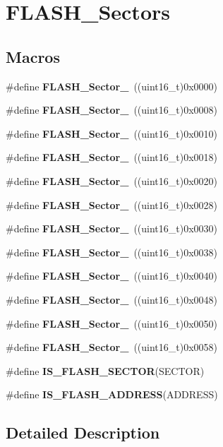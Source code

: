 \section{F\+L\+A\+S\+H\+\_\+\+Sectors}
\label{group__FLASH__Sectors}
\subsection*{Macros}
\begin{DoxyCompactItemize}
\item 
\#define \textbf{ F\+L\+A\+S\+H\+\_\+\+Sector\+\_}~((uint16\+\_\+t)0x0000)
\item 
\#define \textbf{ F\+L\+A\+S\+H\+\_\+\+Sector\+\_}~((uint16\+\_\+t)0x0008)
\item 
\#define \textbf{ F\+L\+A\+S\+H\+\_\+\+Sector\+\_}~((uint16\+\_\+t)0x0010)
\item 
\#define \textbf{ F\+L\+A\+S\+H\+\_\+\+Sector\+\_}~((uint16\+\_\+t)0x0018)
\item 
\#define \textbf{ F\+L\+A\+S\+H\+\_\+\+Sector\+\_}~((uint16\+\_\+t)0x0020)
\item 
\#define \textbf{ F\+L\+A\+S\+H\+\_\+\+Sector\+\_}~((uint16\+\_\+t)0x0028)
\item 
\#define \textbf{ F\+L\+A\+S\+H\+\_\+\+Sector\+\_}~((uint16\+\_\+t)0x0030)
\item 
\#define \textbf{ F\+L\+A\+S\+H\+\_\+\+Sector\+\_}~((uint16\+\_\+t)0x0038)
\item 
\#define \textbf{ F\+L\+A\+S\+H\+\_\+\+Sector\+\_}~((uint16\+\_\+t)0x0040)
\item 
\#define \textbf{ F\+L\+A\+S\+H\+\_\+\+Sector\+\_}~((uint16\+\_\+t)0x0048)
\item 
\#define \textbf{ F\+L\+A\+S\+H\+\_\+\+Sector\+\_}~((uint16\+\_\+t)0x0050)
\item 
\#define \textbf{ F\+L\+A\+S\+H\+\_\+\+Sector\+\_}~((uint16\+\_\+t)0x0058)
\item 
\#define \textbf{ I\+S\+\_\+\+F\+L\+A\+S\+H\+\_\+\+S\+E\+C\+T\+OR}(S\+E\+C\+T\+OR)
\item 
\#define \textbf{ I\+S\+\_\+\+F\+L\+A\+S\+H\+\_\+\+A\+D\+D\+R\+E\+SS}(A\+D\+D\+R\+E\+SS)
\end{DoxyCompactItemize}


\subsection{Detailed Description}


